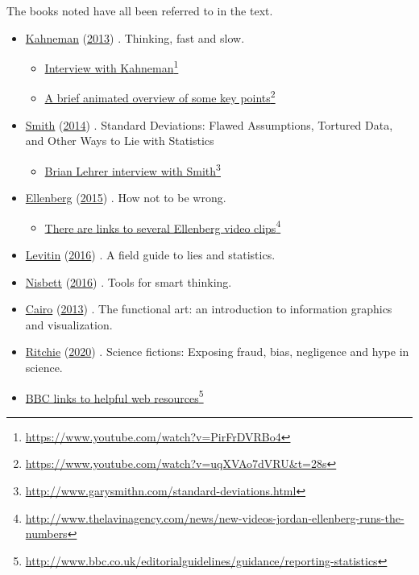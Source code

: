 \documentclass[
  10pt,
  b5paper]{book}
\providecommand{\tightlist}{%
  \setlength{\itemsep}{0pt}\setlength{\parskip}{0pt}}
\begin{document}
The books noted have all been referred to in the text.

\begin{itemize}
\tightlist
\item
  \protect\hyperlink{ref-kahneman_2013}{Kahneman} (\protect\hyperlink{ref-kahneman_2013}{2013}) . Thinking, fast and slow.

  \begin{itemize}
  \tightlist
  \item
    \href{https://www.youtube.com/watch?v=PirFrDVRBo4}{Interview with Kahneman}\footnote{\url{https://www.youtube.com/watch?v=PirFrDVRBo4}}
  \item
    \href{https://www.youtube.com/watch?v=uqXVAo7dVRU\&t=28s}{A brief animated overview of some key points}\footnote{\url{https://www.youtube.com/watch?v=uqXVAo7dVRU\&t=28s}}
  \end{itemize}
\item
  \protect\hyperlink{ref-smith-sd}{Smith} (\protect\hyperlink{ref-smith-sd}{2014}) . Standard Deviations: Flawed Assumptions, Tortured Data, and Other Ways to Lie with Statistics

  \begin{itemize}
  \tightlist
  \item
    \href{http://www.garysmithn.com/standard-deviations.html}{Brian Lehrer interview with Smith}\footnote{\url{http://www.garysmithn.com/standard-deviations.html}}
  \end{itemize}
\item
  \protect\hyperlink{ref-ellenberg_2015}{Ellenberg} (\protect\hyperlink{ref-ellenberg_2015}{2015}) . How not to be wrong.

  \begin{itemize}
  \tightlist
  \item
    \href{http://www.thelavinagency.com/news/new-videos-jordan-ellenberg-runs-the-numbers}{There are links to several Ellenberg video clips}\footnote{\url{http://www.thelavinagency.com/news/new-videos-jordan-ellenberg-runs-the-numbers}}
  \end{itemize}
\item
  \protect\hyperlink{ref-levitin_2016}{Levitin} (\protect\hyperlink{ref-levitin_2016}{2016}) . A field guide to lies and statistics.
\item
  \protect\hyperlink{ref-nisbett}{Nisbett} (\protect\hyperlink{ref-nisbett}{2016}) . Tools for smart thinking.
\item
  \protect\hyperlink{ref-cairo_2013}{Cairo} (\protect\hyperlink{ref-cairo_2013}{2013}) . The functional art: an introduction to information
  graphics and visualization.
\item
  \protect\hyperlink{ref-ritchie2020science}{Ritchie} (\protect\hyperlink{ref-ritchie2020science}{2020}) . Science fictions: Exposing fraud, bias,
  negligence and hype in science.
\item
  \href{http://www.bbc.co.uk/editorialguidelines/guidance/reporting-statistics}{BBC links to helpful web resources}\footnote{\url{http://www.bbc.co.uk/editorialguidelines/guidance/reporting-statistics}}
\end{itemize}
\end{document}
